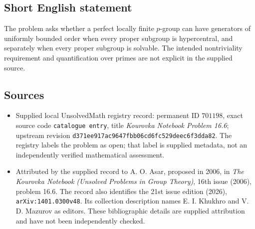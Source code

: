 \documentclass[11pt]{article}
\begin{document}
\subsection{Short English statement}
The problem asks whether a perfect locally finite \(p\)-group can have generators of uniformly bounded order when every proper subgroup is hypercentral, and separately when every proper subgroup is solvable. The intended nontriviality requirement and quantification over primes are not explicit in the supplied source.
\subsection{Sources}
\begin{itemize}
\item Supplied local UnsolvedMath registry record: permanent ID \(701198\), exact source code \texttt{catalogue entry}, title \emph{Kourovka Notebook Problem 16.6}; upstream revision \texttt{d371ee917ac9647fbb06cd6fc529deec6f3dda82}. The registry labels the problem as open; that label is supplied metadata, not an independently verified mathematical assessment.
\item Attributed by the supplied record to A. O. Asar, proposed in 2006, in \emph{The Kourovka Notebook (Unsolved Problems in Group Theory)}, 16th issue (2006), problem 16.6. The record also identifies the 21st issue edition (2026), \texttt{arXiv:1401.0300v48}. Its collection description names E. I. Khukhro and V. D. Mazurov as editors. These bibliographic details are supplied attribution and have not been independently checked.
\end{itemize}
\end{document}
